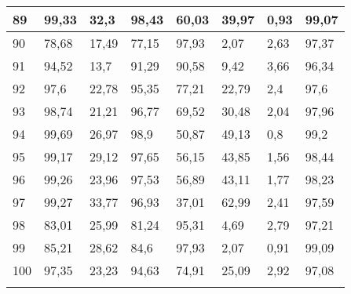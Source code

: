 \begin{longtable}[c]{|l|l|l|l|l|l|l|l|}
89              & 99,33        & 32,3         & 98,43       & 60,03         & 39,97         & 0,93          & 99,07         \\ \hline
90              & 78,68        & 17,49        & 77,15       & 97,93         & 2,07          & 2,63          & 97,37         \\ \hline
91              & 94,52        & 13,7         & 91,29       & 90,58         & 9,42          & 3,66          & 96,34         \\ \hline
92              & 97,6         & 22,78        & 95,35       & 77,21         & 22,79         & 2,4           & 97,6          \\ \hline
93              & 98,74        & 21,21        & 96,77       & 69,52         & 30,48         & 2,04          & 97,96         \\ \hline
94              & 99,69        & 26,97        & 98,9        & 50,87         & 49,13         & 0,8           & 99,2          \\ \hline
95              & 99,17        & 29,12        & 97,65       & 56,15         & 43,85         & 1,56          & 98,44         \\ \hline
96              & 99,26        & 23,96        & 97,53       & 56,89         & 43,11         & 1,77          & 98,23         \\ \hline
97              & 99,27        & 33,77        & 96,93       & 37,01         & 62,99         & 2,41          & 97,59         \\ \hline
98              & 83,01        & 25,99        & 81,24       & 95,31         & 4,69          & 2,79          & 97,21         \\ \hline
99              & 85,21        & 28,62        & 84,6        & 97,93         & 2,07          & 0,91          & 99,09         \\ \hline
100             & 97,35        & 23,23        & 94,63       & 74,91         & 25,09         & 2,92          & 97,08         \\ \hline
\label{anx:entropia}
\end{longtable}
